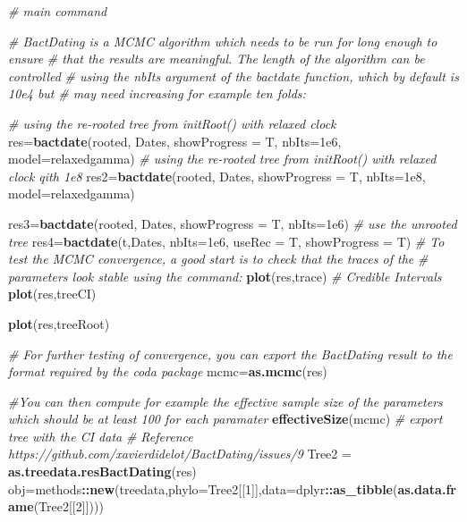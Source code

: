 \documentclass[
]{book}
\newenvironment{Shaded}{\begin{snugshade}}{\end{snugshade}}
\newcommand{\AttributeTok}[1]{\textcolor[rgb]{0.13,0.29,0.53}{#1}}
\newcommand{\CommentTok}[1]{\textcolor[rgb]{0.56,0.35,0.01}{\textit{#1}}}
\newcommand{\DecValTok}[1]{\textcolor[rgb]{0.00,0.00,0.81}{#1}}
\newcommand{\FloatTok}[1]{\textcolor[rgb]{0.00,0.00,0.81}{#1}}
\newcommand{\FunctionTok}[1]{\textcolor[rgb]{0.13,0.29,0.53}{\textbf{#1}}}
\newcommand{\NormalTok}[1]{#1}
\newcommand{\OtherTok}[1]{\textcolor[rgb]{0.56,0.35,0.01}{#1}}
\newcommand{\SpecialCharTok}[1]{\textcolor[rgb]{0.81,0.36,0.00}{\textbf{#1}}}
\newcommand{\StringTok}[1]{\textcolor[rgb]{0.31,0.60,0.02}{#1}}
\begin{document}
\begin{Shaded}
\begin{Highlighting}[]
\CommentTok{\# main command}

\CommentTok{\# BactDating is a MCMC algorithm which needs to be run for long enough to ensure}
\CommentTok{\# that the results are meaningful. The length of the algorithm can be controlled}
\CommentTok{\# using the nbIts argument of the bactdate function, which by default is 10e4 but}
\CommentTok{\# may need increasing for example ten folds:}

\CommentTok{\# using the re{-}rooted tree from initRoot() with relaxed clock}
\NormalTok{res}\OtherTok{=}\FunctionTok{bactdate}\NormalTok{(rooted, Dates, }\AttributeTok{showProgress =}\NormalTok{ T, }\AttributeTok{nbIts=}\FloatTok{1e6}\NormalTok{, }\AttributeTok{model=}\StringTok{\textquotesingle{}relaxedgamma\textquotesingle{}}\NormalTok{)}
\CommentTok{\# using the re{-}rooted tree from initRoot() with relaxed clock qith 1e8}
\NormalTok{res2}\OtherTok{=}\FunctionTok{bactdate}\NormalTok{(rooted, Dates, }\AttributeTok{showProgress =}\NormalTok{ T, }\AttributeTok{nbIts=}\FloatTok{1e8}\NormalTok{, }\AttributeTok{model=}\StringTok{\textquotesingle{}relaxedgamma\textquotesingle{}}\NormalTok{)}

\NormalTok{res3}\OtherTok{=}\FunctionTok{bactdate}\NormalTok{(rooted, Dates, }\AttributeTok{showProgress =}\NormalTok{ T, }\AttributeTok{nbIts=}\FloatTok{1e6}\NormalTok{)}
\CommentTok{\# use the unrooted tree}
\NormalTok{res4}\OtherTok{=}\FunctionTok{bactdate}\NormalTok{(t,Dates, }\AttributeTok{nbIts=}\FloatTok{1e6}\NormalTok{, }\AttributeTok{useRec =}\NormalTok{ T, }\AttributeTok{showProgress =}\NormalTok{ T)}
\CommentTok{\# To test the MCMC convergence, a good start is to check that the traces of the}
\CommentTok{\# parameters look stable using the command:}
\FunctionTok{plot}\NormalTok{(res,}\StringTok{\textquotesingle{}trace\textquotesingle{}}\NormalTok{)}
\CommentTok{\# Credible Intervals}
\FunctionTok{plot}\NormalTok{(res,}\StringTok{\textquotesingle{}treeCI\textquotesingle{}}\NormalTok{)}

\FunctionTok{plot}\NormalTok{(res,}\StringTok{\textquotesingle{}treeRoot\textquotesingle{}}\NormalTok{)}

\CommentTok{\# For further testing of convergence, you can export the BactDating result to the format required by the coda package}
\NormalTok{mcmc}\OtherTok{=}\FunctionTok{as.mcmc}\NormalTok{(res)}

\CommentTok{\#You can then compute for example the effective sample size of the parameters which should be at least 100 for each paramater}
\FunctionTok{effectiveSize}\NormalTok{(mcmc)}
\CommentTok{\# export tree with the CI data}
\CommentTok{\# Reference https://github.com/xavierdidelot/BactDating/issues/9}
\NormalTok{Tree2 }\OtherTok{=} \FunctionTok{as.treedata.resBactDating}\NormalTok{(res)}
\NormalTok{obj}\OtherTok{=}\NormalTok{methods}\SpecialCharTok{::}\FunctionTok{new}\NormalTok{(}\StringTok{\textquotesingle{}treedata\textquotesingle{}}\NormalTok{,}\AttributeTok{phylo=}\NormalTok{Tree2[[}\DecValTok{1}\NormalTok{]],}\AttributeTok{data=}\NormalTok{dplyr}\SpecialCharTok{::}\FunctionTok{as\_tibble}\NormalTok{(}\FunctionTok{as.data.frame}\NormalTok{(Tree2[[}\DecValTok{2}\NormalTok{]])))}


\end{Highlighting}
\end{Shaded}
\end{document}
